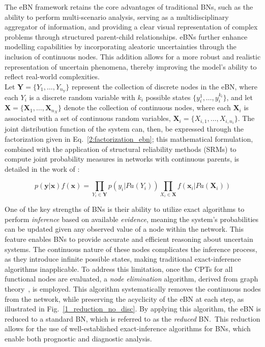 The eBN framework retains the core advantages of traditional BNs, such as the ability to perform multi-scenario analysis, serving as a multidisciplinary aggregator of information, and providing a clear visual representation of complex problems through structured parent-child relationships. 
eBNs further enhance modelling capabilities by incorporating aleatoric uncertainties through the inclusion of continuous nodes.
This addition allows for a more robust and realistic representation of uncertain phenomena, thereby improving the model's ability to reflect real-world complexities.\\

Let $\mathbf{Y} = \{Y_1, \ldots, Y_{n_Y}\}$ represent the collection of discrete nodes in the eBN, where each $Y_i$ is a discrete random variable with $k_i$ possible states $\{y_i^1, \ldots, y_i^{k_i}\}$, and let $\mathbf{X} = \{\mathbf{X}_1, \ldots, \mathbf{X}_{n_X}\}$ denote the collection of continuous nodes, where each $\mathbf{X}_i$ is associated with a set of continuous random variables, $\mathbf{X}_i = \{X_{i,1}, \ldots, X_{i,n_i}\}$. The joint distribution function of the system can, then, be expressed through the factorization given in Eq.~\ref{2:factorization_ebn}; this mathematical formulation, combined with the application of structural reliability methods (SRMs) to compute joint probability measures in networks with continuous parents, is detailed in the work of \textcite{straub_bayesian_2010}:

\begin{equation}
    \label{2:factorization_ebn}
    p(\mathbf{y}|\mathbf{x})f(\mathbf{x}) = \prod_{Y_i\in \mathbf{Y}} p(y_i|Pa(Y_i)) \prod_{X_i\in \mathbf{X}} f(\mathbf{x}_i|Pa(\mathbf{X}_i)) 
\end{equation}

One of the key strengths of BNs is their ability to utilize exact algorithms to perform \textit{inference} based on available \textit{evidence}, meaning the system's probabilities can be updated given any observed value of a node within the network.
This feature enables BNs to provide accurate and efficient reasoning about uncertain systems. 
The continuous nature of these nodes complicates the inference process, as they introduce infinite possible states, making traditional exact-inference algorithms inapplicable.  
To address this limitation, once the CPTs for all functional nodes are evaluated, a \textit{node elimination} algorithm, derived from graph theory~\cite{Shachter86a}, is employed. 
This algorithm systematically removes the continuous nodes from the network, while preserving the acyclicity of the eBN at each step, as illustrated in Fig.~\ref{1_reduction_no_disc}. 
By applying this algorithm, the eBN is reduced to a standard BN, which is referred to as the \textit{reduced} BN.\ This reduction allows for the use of well-established exact-inference algorithms for BNs, which enable both prognostic and diagnostic analysis. \\


